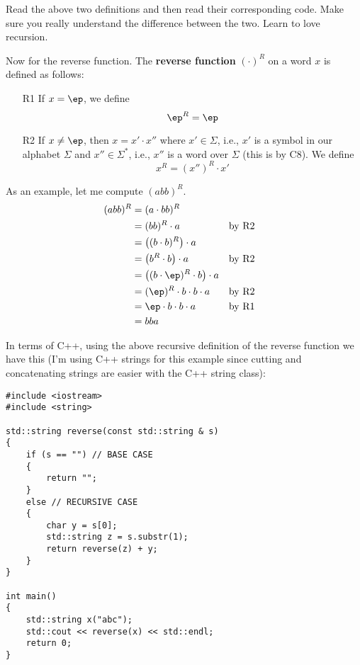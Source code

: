 Read the above two definitions and then read their corresponding code.
Make sure you really understand the difference between the two.
Learn to love recursion.




\newpage
Now for the reverse function. 
The {\bf reverse function} 
$(\cdot)^R$ on a word $x$ is defined as follows:
\begin{enumerate}
\item[R1] If $x = \ep$, we define
\[
\ep^R = \ep
\]
\item[R2] If $x \neq \ep$, then $x = x'\cdot x''$ where
$x' \in \Sigma$, i.e., $x'$ is a symbol in our alphabet $\Sigma$
and $x'' \in \Sigma^*$, i.e., $x''$ is a word over $\Sigma$ (this is by C8). 
We define
\[
x^R = (x'')^R \cdot x'
\]
\end{enumerate}
As an example, let me compute $(abb)^R$.
\begin{align*}
(abb)^R
&= (a \cdot bb)^R                                   \\
&= (bb)^R \cdot a                  & & \text{by R2} \\
&= \left( (b\cdot b)^R \right) \cdot a & &              \\
&= \left( b^R \cdot b \right) \cdot a             & & \text{by R2} \\
&= \left( (b\cdot \ep)^R \cdot b \right) \cdot a  & &              \\
&= (\ep)^R \cdot b \cdot b \cdot a & & \text{by R2} \\
&= \ep \cdot b \cdot b \cdot a     & & \text{by R1} \\
&= bba                                              \\
\end{align*}

In terms of C++, using the above recursive definition of the
reverse function we have this (I'm using C++ strings for this example
since cutting and concatenating strings are easier with the C++ string
class):

\begin{Verbatim}[frame=single]
#include <iostream>
#include <string>

std::string reverse(const std::string & s)
{
    if (s == "") // BASE CASE
    {
        return "";
    }
    else // RECURSIVE CASE
    {
        char y = s[0];
        std::string z = s.substr(1);
        return reverse(z) + y;
    }
}

int main()
{
    std::string x("abc");
    std::cout << reverse(x) << std::endl;    
    return 0;
}
\end{Verbatim}

